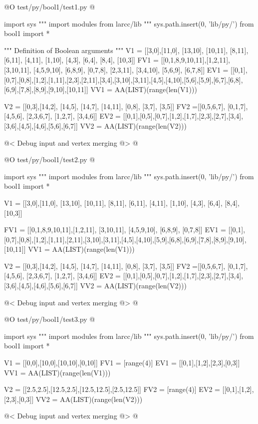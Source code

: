 \documentclass[11pt,oneside]{article}	%
\begin{document}
@O test/py/bool1/test1.py
@{
import sys
""" import modules from larcc/lib """
sys.path.insert(0, 'lib/py/')
from bool1 import *

""" Definition of Boolean arguments """
V1 = [[3,0],[11,0], [13,10], [10,11], [8,11], [6,11], [4,11], [1,10], [4,3], [6,4], 
	[8,4], [10,3]]
FV1 = [[0,1,8,9,10,11],[1,2,11], [3,10,11], [4,5,9,10], [6,8,9], [0,7,8], [2,3,11],
	[3,4,10], [5,6,9], [6,7,8]]
EV1 = [[0,1],[0,7],[0,8],[1,2],[1,11],[2,3],[2,11],[3,4],[3,10],[3,11],[4,5],[4,10],[5,6],[5,9],[6,7],[6,8],[6,9],[7,8],[8,9],[9,10],[10,11]]
VV1 = AA(LIST)(range(len(V1)))

V2 = [[0,3],[14,2], [14,5], [14,7], [14,11], [0,8], [3,7], [3,5]]
FV2 =[[0,5,6,7], [0,1,7], [4,5,6], [2,3,6,7], [1,2,7], [3,4,6]]
EV2 = [[0,1],[0,5],[0,7],[1,2],[1,7],[2,3],[2,7],[3,4],[3,6],[4,5],[4,6],[5,6],[6,7]]
VV2 = AA(LIST)(range(len(V2)))

@< Debug input and vertex merging @>
@}

@O test/py/bool1/test2.py
@{
import sys
""" import modules from larcc/lib """
sys.path.insert(0, 'lib/py/')
from bool1 import *

V1 = [[3,0],[11,0], [13,10], [10,11], [8,11], [6,11], [4,11], [1,10], [4,3], [6,4], 
	[8,4], [10,3]]
	
FV1 = [[0,1,8,9,10,11],[1,2,11], [3,10,11], [4,5,9,10], [6,8,9], [0,7,8]]
EV1 = [[0,1],[0,7],[0,8],[1,2],[1,11],[2,11],[3,10],[3,11],[4,5],[4,10],[5,9],[6,8],[6,9],[7,8],[8,9],[9,10],[10,11]]
VV1 = AA(LIST)(range(len(V1)))

V2 = [[0,3],[14,2], [14,5], [14,7], [14,11], [0,8], [3,7], [3,5]]
FV2 =[[0,5,6,7], [0,1,7], [4,5,6], [2,3,6,7], [1,2,7], [3,4,6]]
EV2 = [[0,1],[0,5],[0,7],[1,2],[1,7],[2,3],[2,7],[3,4],[3,6],[4,5],[4,6],[5,6],[6,7]]
VV2 = AA(LIST)(range(len(V2)))

@< Debug input and vertex merging @>
@}

@O test/py/bool1/test3.py
@{
import sys
""" import modules from larcc/lib """
sys.path.insert(0, 'lib/py/')
from bool1 import *

V1 = [[0,0],[10,0],[10,10],[0,10]]
FV1 = [range(4)]
EV1 = [[0,1],[1,2],[2,3],[0,3]]
VV1 = AA(LIST)(range(len(V1)))

V2 = [[2.5,2.5],[12.5,2.5],[12.5,12.5],[2.5,12.5]]
FV2 = [range(4)]
EV2 = [[0,1],[1,2],[2,3],[0,3]]
VV2 = AA(LIST)(range(len(V2)))

@< Debug input and vertex merging @>
@}
\end{document}
